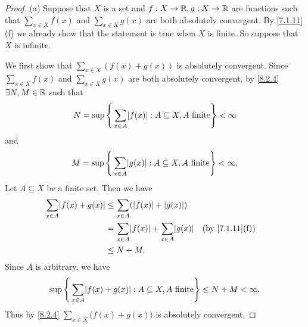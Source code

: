 \begin{proof}{(a)}
  Suppose that \(X\) is a set and \(f : X \to \mathbb{R}, g : X \to \mathbb{R}\) are functions such that \(\sum_{x \in X} f(x)\) and \(\sum_{x \in X} g(x)\) are both absolutely convergent.
  By \cref{7.1.11}(f) we already show that the statement is true when \(X\) is finite.
  So suppose that \(X\) is infinite.

  We first show that \(\sum_{x \in X} (f(x) + g(x))\) is absolutely convergent.
  Since \(\sum_{x \in X} f(x)\) and \(\sum_{x \in X} g(x)\) are both absolutely convergent, by \cref{8.2.4} \(\exists N, M \in \mathbb{R}\) such that
  \[
    N = \sup\Bigg\{\sum_{x \in A} \abs{f(x)} : A \subseteq X, A \text{ finite}\Bigg\} < \infty
  \]
  and
  \[
    M = \sup\Bigg\{\sum_{x \in A} \abs{g(x)} : A \subseteq X, A \text{ finite}\Bigg\} < \infty.
  \]
  Let \(A \subseteq X\) be a finite set.
  Then we have
  \begin{align*}
    \sum_{x \in A} \abs{f(x) + g(x)} & \leq \sum_{x \in A} (\abs{f(x)} + \abs{g(x)})                                             \\
                                     & = \sum_{x \in A} \abs{f(x)} + \sum_{x \in A} \abs{g(x)} &  & \text{(by \cref{7.1.11}(f))} \\
                                     & \leq N + M.
  \end{align*}
  Since \(A\) is arbitrary, we have
  \[
    \sup\Bigg\{\sum_{x \in A} \abs{f(x) + g(x)} : A \subseteq X, A \text{ finite}\Bigg\} \leq N + M < \infty.
  \]
  Thus by \cref{8.2.4} \(\sum_{x \in X} \big(f(x) + g(x)\big)\) is absolutely convergent.


\end{proof}
